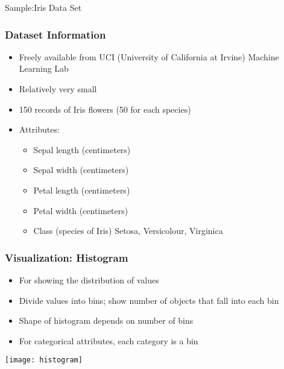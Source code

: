 \begin{frame}
  \begin{center}
    {\Large Sample:Iris Data Set }
  \end{center}
\end{frame}

\begin{frame}[fragile]\frametitle{Dataset Information}	
\begin{itemize}
\item Freely available from UCI (University of California at Irvine) Machine Learning Lab
\item Relatively very small
\item 150 records of Iris flowers (50 for each species)
\item Attributes:
\begin{itemize}
\item Sepal length (centimeters)
\item Sepal width (centimeters)
\item Petal length (centimeters)
\item Petal width (centimeters)
\item Class (species of Iris) {Setosa, Versicolour, Virginica}
\end{itemize}
\end{itemize}
\end{frame}


\begin{frame}[fragile]\frametitle{Visualization: Histogram}	
\begin{itemize}
\item For showing the distribution of values
\item Divide values into bins; show number of objects that fall into each bin
\item Shape of histogram depends on number of bins
\item For categorical attributes, each category is a bin
\end{itemize}
\begin{center}
\texttt{[image: histogram]}
\end{center}
\end{frame}


